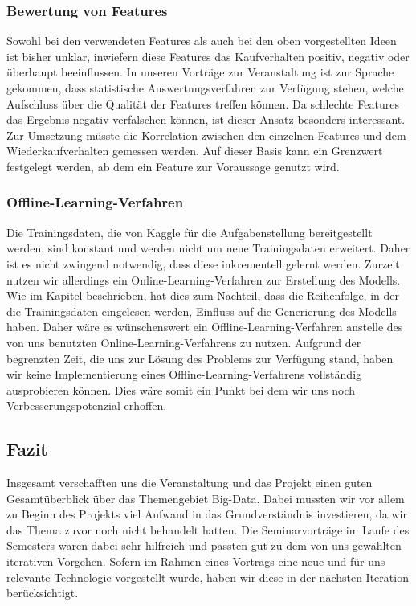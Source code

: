 \subsubsection{Bewertung von Features}	
Sowohl bei den verwendeten Features als auch bei den oben vorgestellten Ideen ist bisher unklar, inwiefern diese Features das Kaufverhalten positiv, negativ oder überhaupt beeinflussen.
In unseren Vorträge zur Veranstaltung ist zur Sprache gekommen, dass statistische Auswertungsverfahren zur Verfügung stehen, welche Aufschluss über die Qualität der Features treffen können. Da schlechte Features das Ergebnis negativ verfälschen können, ist dieser Ansatz besonders interessant.
Zur Umsetzung müsste die Korrelation zwischen den einzelnen Features und dem Wiederkaufverhalten gemessen werden. Auf dieser Basis kann ein Grenzwert festgelegt werden, ab dem ein Feature
zur Voraussage genutzt wird.

\subsubsection{Offline-Learning-Verfahren}	
Die Trainingsdaten, die von Kaggle für die Aufgabenstellung bereitgestellt werden, sind konstant und werden 
nicht um neue Trainingsdaten erweitert. Daher ist es nicht zwingend notwendig, dass diese inkrementell gelernt
werden. Zurzeit nutzen wir allerdings ein Online-Learning-Verfahren zur Erstellung des Modells. Wie im Kapitel
 beschrieben, hat dies zum Nachteil, dass die Reihenfolge, in der die Trainingsdaten
eingelesen werden, Einfluss auf die Generierung des Modells haben. Daher wäre es wünschenswert ein Offline-Learning-Verfahren
anstelle des von uns benutzten Online-Learning-Verfahrens zu nutzen. Aufgrund der begrenzten Zeit, die uns zur 
Lösung des Problems zur Verfügung stand, haben wir keine Implementierung eines Offline-Learning-Verfahrens vollständig 
ausprobieren können. Dies wäre somit ein Punkt bei dem wir uns noch Verbesserungspotenzial erhoffen.

\subsection{Fazit}
Insgesamt verschafften uns die Veranstaltung und das Projekt einen guten Gesamtüberblick über das Themengebiet Big-Data.
Dabei mussten wir vor allem zu Beginn des Projekts viel Aufwand in das Grundverständnis investieren, da wir das Thema zuvor noch nicht behandelt hatten.
Die Seminarvorträge im Laufe des Semesters waren dabei sehr hilfreich und passten gut zu dem von uns gewählten iterativen Vorgehen.
Sofern im Rahmen eines Vortrags eine neue und für uns relevante Technologie vorgestellt wurde, haben wir diese in der nächsten Iteration berücksichtigt.  

